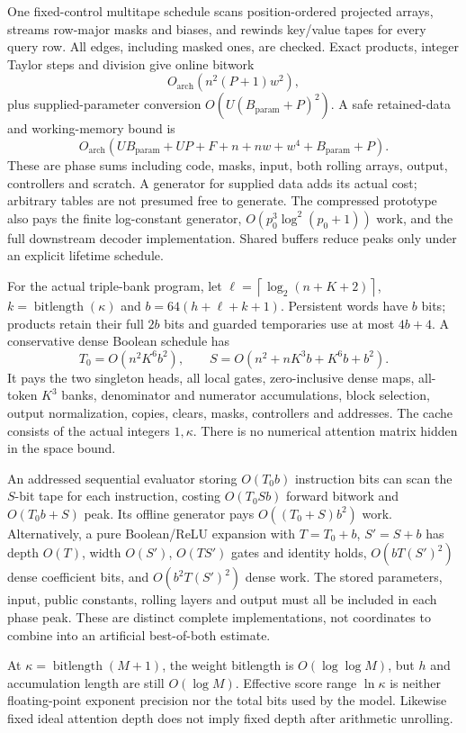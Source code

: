 \documentclass[11pt,letterpaper]{article}
\theoremstyle{definition}\newtheorem{definition}[theorem]{Definition}
\theoremstyle{remark}\newtheorem{remark}[theorem]{Remark}
\newcommand{\ceil}[1]{\left\lceil #1\right\rceil}
\newcommand{\bl}{\operatorname{bitlength}}
\begin{document}
One fixed-control multitape schedule scans position-ordered projected arrays, streams row-major masks and biases, and rewinds key/value tapes for every query row. All edges, including masked ones, are checked. Exact products, integer Taylor steps and division give online bitwork
\[
 O_{\mathrm{arch}}(n^2(P+1)w^2),
\]
plus supplied-parameter conversion $O(U(B_{\mathrm{param}}+P)^2)$. A safe retained-data and working-memory bound is
\[
 O_{\mathrm{arch}}(UB_{\mathrm{param}}+UP+F+n+nw+w^4+B_{\mathrm{param}}+P).
\]
These are phase sums including code, masks, input, both rolling arrays, output, controllers and scratch. A generator for supplied data adds its actual cost; arbitrary tables are not presumed free to generate. The compressed prototype also pays the finite log-constant generator, $O(p_0^3\log^2(p_0+1))$ work, and the full downstream decoder implementation. Shared buffers reduce peaks only under an explicit lifetime schedule.

For the actual triple-bank program, let $\ell=\ceil{\log_2(n+K+2)}$, $k=\bl(\kappa)$ and $b=64(h+\ell+k+1)$. Persistent words have $b$ bits; products retain their full $2b$ bits and guarded temporaries use at most $4b+4$. A conservative dense Boolean schedule has
\begin{equation}\label{eq:costtriple}
 T_0=O(n^2K^6b^2),\qquad
 S=O(n^2+nK^3b+K^6b+b^2).
\end{equation}
It pays the two singleton heads, all local gates, zero-inclusive dense maps, all-token $K^3$ banks, denominator and numerator accumulations, block selection, output normalization, copies, clears, masks, controllers and addresses. The cache consists of the actual integers $1,\kappa$. There is no numerical attention matrix hidden in the space bound.

An addressed sequential evaluator storing $O(T_0b)$ instruction bits can scan the $S$-bit tape for each instruction, costing $O(T_0Sb)$ forward bitwork and $O(T_0b+S)$ peak. Its offline generator pays $O((T_0+S)b^2)$ work. Alternatively, a pure Boolean/ReLU expansion with $T=T_0+b$, $S'=S+b$ has depth $O(T)$, width $O(S')$, $O(TS')$ gates and identity holds, $O(bT(S')^2)$ dense coefficient bits, and $O(b^2T(S')^2)$ dense work. The stored parameters, input, public constants, rolling layers and output must all be included in each phase peak. These are distinct complete implementations, not coordinates to combine into an artificial best-of-both estimate.

At $\kappa=\bl(M+1)$, the weight bitlength is $O(\log\log M)$, but $h$ and accumulation length are still $O(\log M)$. Effective score range $\ln\kappa$ is neither floating-point exponent precision nor the total bits used by the model. Likewise fixed ideal attention depth does not imply fixed depth after arithmetic unrolling.
\end{document}

